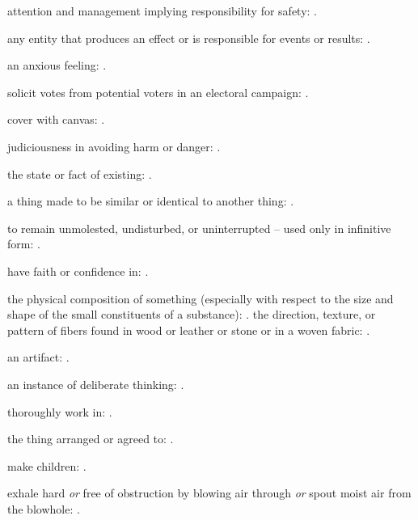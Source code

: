   attention and management implying responsibility for safety:   .

  any entity that produces an effect or is responsible for events or results:   .

  an anxious feeling:   .

  solicit votes from potential voters in an electoral campaign:   .

  cover with canvas: .

  judiciousness in avoiding harm or danger:   .

  the state or fact of existing:   .

  a thing made to be similar or identical to another thing: .

  to remain unmolested, undisturbed, or uninterrupted -- used only in infinitive form: .

  have faith or confidence in:   .

  the physical composition of something (especially with respect to the size and shape of the small constituents of a substance):   . the direction, texture, or pattern of fibers found in wood or leather or stone or in a woven fabric: .

  an artifact: .

  an instance of deliberate thinking: .

  thoroughly work in:   .

  the thing arranged or agreed to:   .

  make children:   .

  exhale hard \textit{or} free of obstruction by blowing air through \textit{or} spout moist air from the blowhole: .

